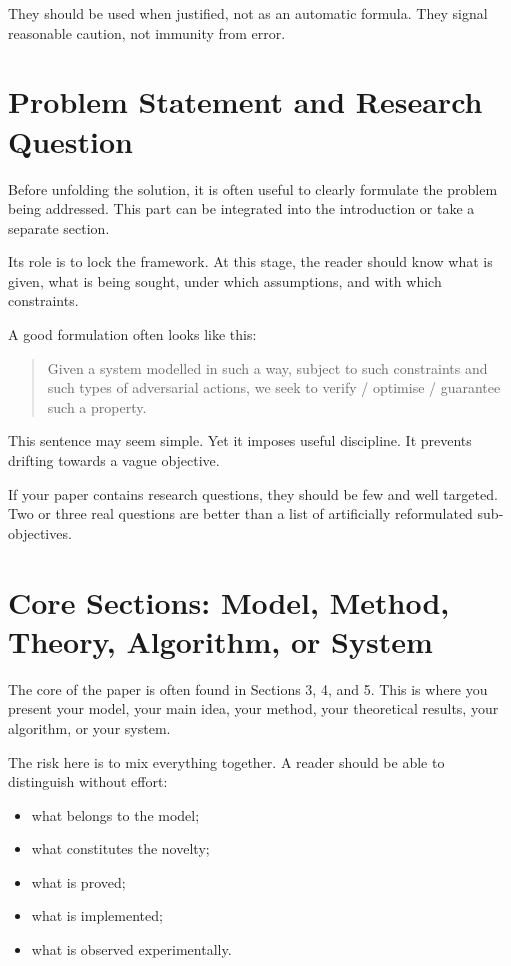 \documentclass[11pt,a4paper]{article}
\theoremstyle{definition}
\begin{document}
They should be used when justified, not as an automatic formula. They signal reasonable caution, not immunity from error.

\section{Problem Statement and Research Question}

Before unfolding the solution, it is often useful to clearly formulate the problem being addressed. This part can be integrated into the introduction or take a separate section.

Its role is to lock the framework. At this stage, the reader should know what is given, what is being sought, under which assumptions, and with which constraints.

A good formulation often looks like this:
\begin{quote}
Given a system modelled in such a way, subject to such constraints and such types of adversarial actions, we seek to verify / optimise / guarantee such a property.
\end{quote}

This sentence may seem simple. Yet it imposes useful discipline. It prevents drifting towards a vague objective.

If your paper contains research questions, they should be few and well targeted. Two or three real questions are better than a list of artificially reformulated sub-objectives.

\section{Core Sections: Model, Method, Theory, Algorithm, or System}

The core of the paper is often found in Sections 3, 4, and 5. This is where you present your model, your main idea, your method, your theoretical results, your algorithm, or your system.

The risk here is to mix everything together. A reader should be able to distinguish without effort:
\begin{itemize}
    \item what belongs to the model;
    \item what constitutes the novelty;
    \item what is proved;
    \item what is implemented;
    \item what is observed experimentally.
\end{itemize}
\end{document}
